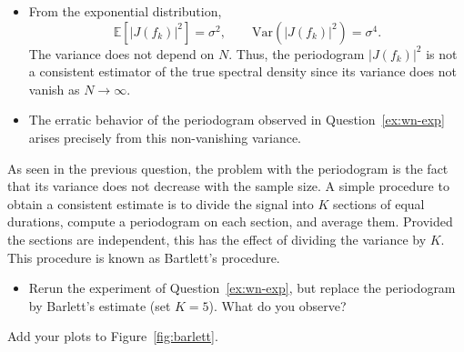 \documentclass[11pt]{article}
\begin{document}
\begin{solution}
\begin{itemize}
\item From the exponential distribution,
\[
\mathbb{E}[|J(f_k)|^2] = \sigma^2, 
\qquad
\mathrm{Var}(|J(f_k)|^2) = \sigma^4.
\]
The variance does not depend on \(N\). Thus, the periodogram \( |J(f_k)|^2 \) is not a consistent estimator of the true spectral density since its variance does not vanish as \(N \to \infty\).

\item The erratic behavior of the periodogram observed in Question~\ref{ex:wn-exp} arises precisely from this non-vanishing variance.
\end{itemize}
\end{solution}


\begin{exercise}\label{q:barlett}
    As seen in the previous question, the problem with the periodogram is the fact that its variance does not decrease with the sample size.
    A simple procedure to obtain a consistent estimate is to divide the signal into $K$ sections of equal durations, compute a periodogram on each section, and average them.
    Provided the sections are independent, this has the effect of dividing the variance by $K$. 
    This procedure is known as Bartlett's procedure.
    \begin{itemize}
        \item Rerun the experiment of Question~\ref{ex:wn-exp}, but replace the periodogram by Barlett's estimate (set $K=5$). What do you observe?
    \end{itemize}
    Add your plots to Figure~\ref{fig:barlett}.
\end{exercise}

\end{document}
